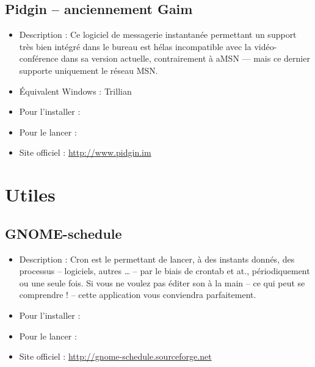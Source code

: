 \subsection{Pidgin -- anciennement Gaim}
\label{RefPidgin}
\begin{itemize}
\begingroup
{}
\item Description : Ce logiciel de messagerie instantanée permettant un support  très bien intégré dans le bureau  est hélas incompatible avec la vidéo-conférence dans sa version actuelle, contrairement à aMSN --- mais ce dernier supporte uniquement le réseau MSN.{\par}
\item Équivalent Windows : Trillian{\par}
\item Pour l'installer : 
\item Pour le lancer : 
\item Site officiel : \url{http://www.pidgin.im}{\par}
\endgroup
\end{itemize}
\section{Utiles}
\subsection{GNOME-schedule}
\begin{itemize}
\begingroup
{}
\item Description : Cron est le  permettant de lancer, à des instants donnés, des processus -- logiciels, autres \ldots{} -- par le biais de crontab et at., périodiquement ou une seule fois. Si vous ne voulez pas éditer son  à la main -- ce qui peut se comprendre ! -- cette application vous conviendra parfaitement.{\par}
\endgroup
\item Pour l'installer : 
\item Pour le lancer : 
\item Site officiel : \url{http://gnome-schedule.sourceforge.net}{\par}
\end{itemize}
